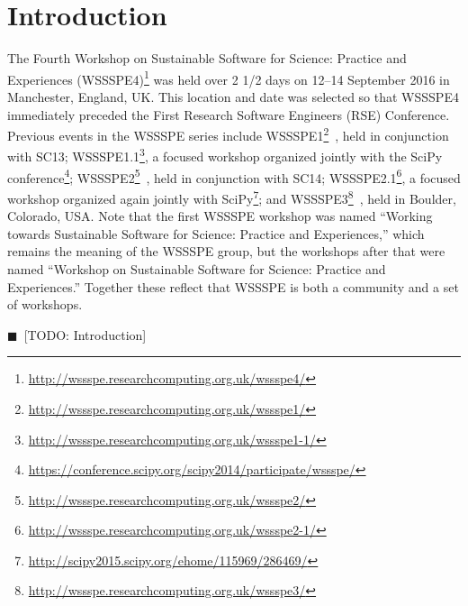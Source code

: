\documentclass[11pt, oneside]{amsart}
\newcommand{\todo}[1]{{\color{blue}$\blacksquare$~\textsf{[TODO: #1]}}}
\begin{document}
\maketitle
\newpage

\section{Introduction} \label{sec:intro}

The Fourth Workshop on Sustainable Software for Science: Practice and Experiences
(WSSSPE4)\footnote{\url{http://wssspe.researchcomputing.org.uk/wssspe4/}} was
held over 2 1/2 days on 12--14 September 2016 in Manchester, England, UK.
This location and date was selected so that WSSSPE4 immediately preceded the
First Research Software Engineers (RSE) Conference.
Previous events in the WSSSPE series include
WSSSPE1\footnote{\url{http://wssspe.researchcomputing.org.uk/wssspe1/}}~\cite{WSSSPE1-pre-report,WSSSPE1},
held in conjunction with SC13;
WSSSPE1.1\footnote{\url{http://wssspe.researchcomputing.org.uk/wssspe1-1/}}, a
focused workshop organized jointly with the SciPy
conference\footnote{\url{https://conference.scipy.org/scipy2014/participate/wssspe/}};
WSSSPE2\footnote{\url{http://wssspe.researchcomputing.org.uk/wssspe2/}}~\cite{WSSSPE2-pre-report,WSSSPE2},
held in conjunction with SC14;
WSSSPE2.1\footnote{\url{http://wssspe.researchcomputing.org.uk/wssspe2-1/}}, a
focused workshop organized again jointly with
SciPy\footnote{\url{http://scipy2015.scipy.org/ehome/115969/286469/}};
and WSSSPE3\footnote{\url{http://wssspe.researchcomputing.org.uk/wssspe3/}}~\cite{WSSSPE3},
held in Boulder, Colorado, USA.
Note that the first WSSSPE workshop was named
``Working towards
Sustainable Software for Science: Practice and Experiences,'' which remains the meaning
of the WSSSPE group, but the workshops after that were named
``Workshop on Sustainable
Software for Science: Practice and Experiences.'' Together these reflect
that WSSSPE is both a community and a set of workshops.

\todo{Introduction}
\end{document}
